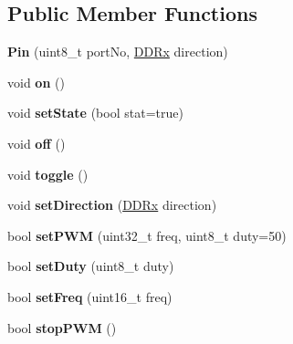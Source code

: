 \subsection*{Public Member Functions}
\begin{DoxyCompactItemize}
\item 
\mbox{\label{classPin_a5a77b8b0c99771c11582f0a011496e6b}} 
{\bfseries Pin} (uint8\+\_\+t port\+No, \hyperlink{portmanager_8h_a63d6a5e91a2b1a4156b6c0466f828554}{D\+D\+Rx} direction)
\item 
\mbox{\label{classPin_ae562d4913700a9af64086bc0bad95a28}} 
void {\bfseries on} ()
\item 
\mbox{\label{classPin_a2488d5db01d0bae6d5fe8932b39d3bbe}} 
void {\bfseries set\+State} (bool stat=true)
\item 
\mbox{\label{classPin_aa568e83b313f1b9f66bb50f66f18e62c}} 
void {\bfseries off} ()
\item 
\mbox{\label{classPin_a5ecffd86fb366af5ff559faf82a1fc81}} 
void {\bfseries toggle} ()
\item 
\mbox{\label{classPin_a49a4bc8df0fad82b4799fa19da708f12}} 
void {\bfseries set\+Direction} (\hyperlink{portmanager_8h_a63d6a5e91a2b1a4156b6c0466f828554}{D\+D\+Rx} direction)
\item 
\mbox{\label{classPin_ae3b0862a7ec9b11f7a8986024669e25a}} 
bool {\bfseries set\+P\+WM} (uint32\+\_\+t freq, uint8\+\_\+t duty=50)
\item 
\mbox{\label{classPin_a938a229474b8319ced9edbad488d6157}} 
bool {\bfseries set\+Duty} (uint8\+\_\+t duty)
\item 
\mbox{\label{classPin_a8610548d2ab0b531e4e0697ca09aeb0c}} 
bool {\bfseries set\+Freq} (uint16\+\_\+t freq)
\item 
\mbox{\label{classPin_a4ea18c4f3780b3af59406be5d0b5a176}} 
bool {\bfseries stop\+P\+WM} ()
\item 
\mbox{\label{classPin_ae04006b8dc5d6fb25ff4e2a781ba047d}} 

\end{DoxyCompactItemize}
